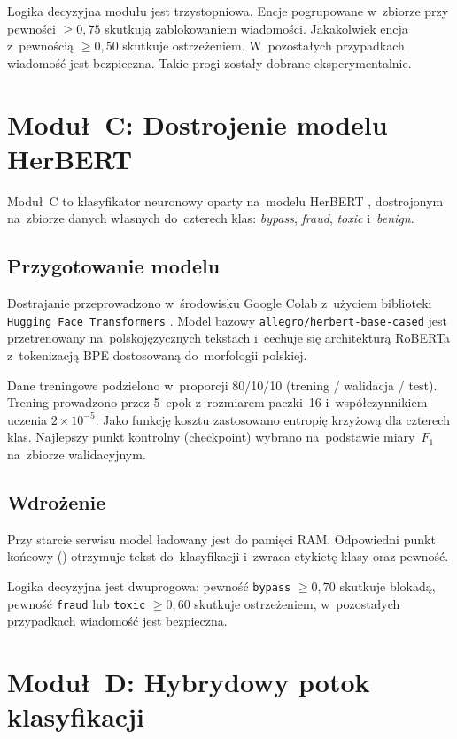 Logika decyzyjna modułu jest trzystopniowa. Encje pogrupowane w~zbiorze
przy pewności $\geq 0{,}75$ skutkują zablokowaniem wiadomości. Jakakolwiek
encja z~pewnością $\geq 0{,}50$ skutkuje ostrzeżeniem. W~pozostałych
przypadkach wiadomość jest bezpieczna. Takie progi zostały dobrane eksperymentalnie.

\section{Moduł~C: Dostrojenie modelu HerBERT}
\label{sec:modul-c}

Moduł~C to klasyfikator neuronowy oparty na~modelu HerBERT
\cite{bib:herbert}, dostrojonym na~zbiorze danych własnych do~czterech
klas: \textit{bypass}, \textit{fraud}, \textit{toxic} i~\textit{benign}.

\subsection{Przygotowanie modelu}

Dostrajanie przeprowadzono w~środowisku Google Colab z~użyciem biblioteki
\texttt{Hugging Face Transformers} \cite{bib:hf-transformers}. Model bazowy
\texttt{allegro/herbert-base-cased} jest przetrenowany na~polskojęzycznych
tekstach i~cechuje się architekturą RoBERTa \cite{bib:roberta} z~tokenizacją
BPE dostosowaną do~morfologii polskiej.

Dane treningowe podzielono w~proporcji 80/10/10 (trening / walidacja / test).
Trening prowadzono przez 5~epok z~rozmiarem paczki~16 i~współczynnikiem uczenia
$2 \times 10^{-5}$. Jako funkcję kosztu zastosowano entropię krzyżową
dla czterech klas. Najlepszy punkt kontrolny (checkpoint) wybrano
na~podstawie miary~$F_1$ na~zbiorze walidacyjnym.

\subsection{Wdrożenie}

Przy starcie serwisu model ładowany jest do pamięci RAM. Odpowiedni punkt końcowy () otrzymuje tekst do~klasyfikacji i~zwraca etykietę klasy oraz pewność.

Logika decyzyjna jest dwuprogowa: pewność \texttt{bypass} $\geq 0{,}70$ skutkuje blokadą, pewność \texttt{fraud} lub \texttt{toxic} $\geq 0{,}60$ skutkuje ostrzeżeniem, w~pozostałych przypadkach wiadomość jest bezpieczna.

\section{Moduł~D: Hybrydowy potok klasyfikacji}
\label{sec:modul-d}

